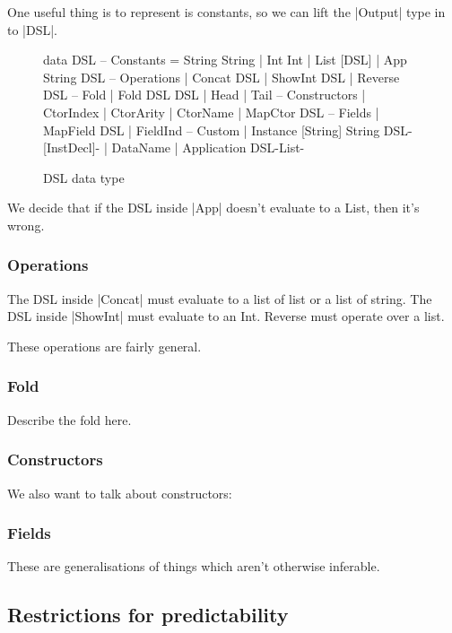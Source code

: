 \documentclass[preprint]{sigplanconf}
\begin{document}
One useful thing is to represent is constants, so we can lift the |Output| type in to |DSL|.

\begin{figure}
\begin{code}
data DSL
    -- Constants
    = String String
    | Int Int
    | List [DSL]
    | App String DSL
    -- Operations
    | Concat DSL
    | ShowInt DSL
    | Reverse DSL
    -- Fold
    | Fold DSL DSL
    | Head
    | Tail
    -- Constructors
    | CtorIndex
    | CtorArity
    | CtorName
    | MapCtor DSL
    -- Fields
    | MapField DSL
    | FieldInd
    -- Custom
    | Instance [String] String DSL{-[InstDecl]-}
    | DataName
    | Application DSL{-List-}
\end{code}
\caption{DSL data type}
\end{figure}

We decide that if the DSL inside |App| doesn't evaluate to a List, then it's wrong.

\subsubsection{Operations}

The DSL inside |Concat| must evaluate to a list of list or a list of string. The DSL inside |ShowInt| must evaluate to an Int. Reverse must operate over a list.

These operations are fairly general.

\subsubsection{Fold}

Describe the fold here.

\subsubsection{Constructors}

We also want to talk about constructors:

\subsubsection{Fields}

These are generalisations of things which aren't otherwise inferable.



\subsection{Restrictions for predictability}
\end{document}
